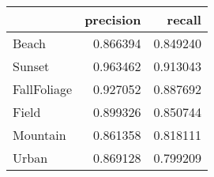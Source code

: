 \begin{tabular}{lrr}
\toprule
 & precision & recall \\
\midrule
Beach & 0.866394 & 0.849240 \\
Sunset & 0.963462 & 0.913043 \\
FallFoliage & 0.927052 & 0.887692 \\
Field & 0.899326 & 0.850744 \\
Mountain & 0.861358 & 0.818111 \\
Urban & 0.869128 & 0.799209 \\
\bottomrule
\end{tabular}
